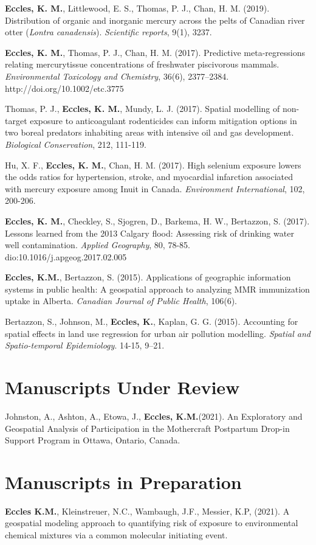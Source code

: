 \documentclass[margin,line]{res}
\begin{document}
\begin{resume}
\textbf{Eccles, K. M.}, Littlewood, E. S., Thomas, P. J., Chan, H. M. (2019). Distribution of organic and inorganic mercury across the pelts of Canadian river otter (\textit{Lontra canadensis}). \textit{Scientific reports}, 9(1), 3237.

\textbf{Eccles, K. M.}, Thomas, P. J., Chan, H. M. (2017). Predictive meta-regressions relating mercurytissue concentrations of freshwater piscivorous mammals. \textit{Environmental Toxicology and Chemistry}, 36(6), 2377–2384. http://doi.org/10.1002/etc.3775

Thomas, P. J., \textbf{Eccles, K. M.}, Mundy, L. J. (2017). Spatial modelling of non-target exposure to anticoagulant rodenticides can inform mitigation options in two boreal predators inhabiting areas with intensive oil and gas development. \textit{Biological Conservation}, 212, 111-119.

Hu, X. F., \textbf{Eccles, K. M.}, Chan, H. M. (2017). High selenium exposure lowers the odds ratios for hypertension, stroke, and myocardial infarction associated with mercury exposure among Inuit in Canada. \textit{Environment International}, 102, 200-206.

\textbf{Eccles, K. M.}, Checkley, S., Sjogren, D., Barkema, H. W., Bertazzon, S. (2017). Lessons learned from the 2013 Calgary flood: Assessing risk of drinking water well contamination. \textit{Applied Geography}, 80, 78-85. dio:10.1016/j.apgeog.2017.02.005

\textbf{Eccles, K.M.}, Bertazzon, S. (2015). Applications of geographic information systems in public health: A geospatial approach to analyzing MMR immunization uptake in Alberta. \textit{Canadian Journal of Public Health}, 106(6).

Bertazzon, S., Johnson, M., \textbf{Eccles, K.}, Kaplan, G. G. (2015). Accounting for spatial effects in land use regression for urban air pollution modelling. \textit{Spatial and Spatio-temporal Epidemiology}. 14-15, 9–21.

\section{\sc Manuscripts Under Review}

Johnston, A., Ashton, A., Etowa, J., \textbf{Eccles, K.M.}(2021). An Exploratory and Geospatial Analysis of Participation in the Mothercraft Postpartum Drop-in Support Program in Ottawa, Ontario, Canada.

\vspace*{.1in}
\section{\sc Manuscripts in Preparation}
\textbf{Eccles K.M.}, Kleinstreuer, N.C., Wambaugh, J.F., Messier, K.P, (2021). A geospatial modeling approach to quantifying risk of exposure to environmental chemical mixtures via a common molecular initiating event.


\end{resume}
\end{document}
